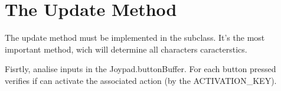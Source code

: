 	\section{The Update Method}
	The update method must be implemented in the subclass.  It's the most important method, wich will determine all characters caracterstics.
	
	Fisrtly, analise inputs in the Joypad.buttonBuffer. For each button pressed verifies if can activate the associated action (by the ACTIVATION\_KEY). 